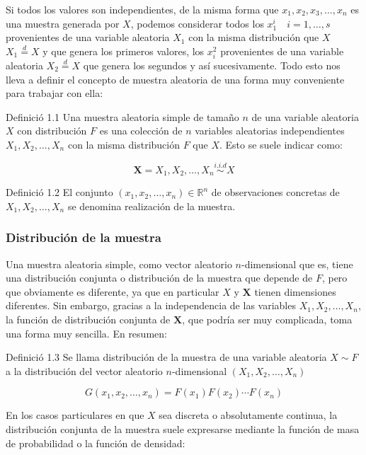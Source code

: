 \documentclass[
]{article}
\begin{document}
Si todos los valores son independientes, de la misma forma que \(x_{1}, x_{2}, x_{3}, \ldots, x_{n}\) es una muestra generada por \(X\), podemos considerar todos los \(x_{1}^{i} \quad i=1, \ldots, s\) provenientes de una variable aleatoria \(X_{1}\) con la misma distribución que \(X\) \(X_{1} \stackrel{d}{=} X\) y que genera los primeros valores, los \(x_{i}^{2}\) provenientes de una variable aleatoria \(X_{2} \stackrel{d}{=} X\) que genera los segundos y así sucesivamente.
Todo esto nos lleva a definir el concepto de muestra aleatoria de una forma muy conveniente para trabajar con ella:

Definició 1.1 Una muestra aleatoria simple de tamaño \(n\) de una variable aleatoria \(X\) con distribución \(F\) es una colección de \(n\) variables aleatorias independientes \(X_{1}, X_{2}, \ldots, X_{n}\) con la misma distribución \(F\) que \(X\). Esto se suele indicar como:

\[
\mathbf{X}=X_{1}, X_{2}, \ldots, X_{n} \stackrel{i . i . d}{\sim} X
\]

Definició 1.2 El conjunto \(\left(x_{1}, x_{2}, \ldots, x_{n}\right) \in \mathbb{R}^{n}\) de observaciones concretas de \(X_{1}, X_{2}, \ldots, X_{n}\) se denomina realización de la muestra.

\subsubsection{Distribución de la muestra}\label{distribuciuxf3n-de-la-muestra}

Una muestra aleatoria simple, como vector aleatorio \(n\)-dimensional que es, tiene una distribución conjunta o distribución de la muestra que depende de \(F\), pero que obviamente es diferente, ya que en particular \(X\) y \(\mathbf{X}\) tienen dimensiones diferentes. Sin embargo, gracias a la independencia de las variables \(X_{1}, X_{2}, \ldots, X_{n}\), la función de distribución conjunta de \(\mathbf{X}\), que podría ser muy complicada, toma una forma muy sencilla. En resumen:

Definició 1.3 Se llama distribución de la muestra de una variable aleatoria \(X \sim F\) a la distribución del vector aleatorio \(n\)-dimensional \(\left(X_{1}, X_{2}, \ldots, X_{n}\right)\)

\[
G\left(x_{1}, x_{2}, \ldots, x_{n}\right)=F\left(x_{1}\right) F\left(x_{2}\right) \cdots F\left(x_{n}\right)
\]

En los casos particulares en que \(X\) sea discreta o absolutamente continua, la distribución conjunta de la muestra suele expresarse mediante la función de masa de probabilidad o la función de densidad:
\end{document}
